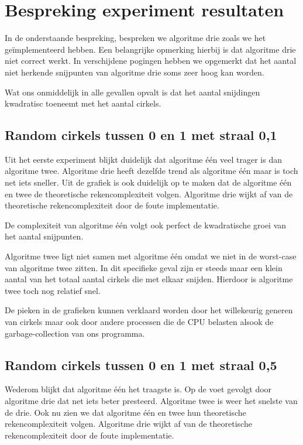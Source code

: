 \documentclass[11pt,a4paper]{article}
\begin{document}
\section{Bespreking experiment resultaten}

In de onderstaande bespreking, bespreken we algoritme drie zoals we het ge\"implementeerd hebben. Een belangrijke opmerking hierbij is dat algoritme drie niet correct werkt. In verschijdene pogingen hebben we opgemerkt dat het aantal niet herkende snijpunten van algoritme drie soms zeer hoog kan worden.

Wat ons onmiddelijk in alle gevallen opvalt is dat het aantal snijdingen kwadratisc toeneemt met het aantal cirkels.

\subsection{Random cirkels tussen 0 en 1 met straal 0,1}

Uit het eerste experiment blijkt duidelijk dat algoritme \'e\'en veel trager is dan algoritme twee. Algoritme drie heeft dezelfde trend als algoritme \'e\'en maar is toch net iets sneller. Uit de grafiek is ook duidelijk op te maken dat de algoritme \'e\'en en twee de theoretische rekencomplexiteit volgen. Algoritme drie wijkt af van de theoretische rekencomplexiteit door de foute implementatie.

De complexiteit van algoritme \'e\'en volgt ook perfect de kwadratische groei van het aantal snijpunten.

Algoritme twee ligt niet samen met algoritme \'e\'en omdat we niet in de worst-case van algoritme twee zitten. In dit specifieke geval zijn er steeds maar een klein aantal van het totaal aantal cirkels die met elkaar snijden. Hierdoor is algoritme twee toch nog relatief snel.

De pieken in de grafieken kunnen verklaard worden door het willekeurig generen van cirkels maar ook door andere processen die de CPU belasten alsook de garbage-collection van ons programma. 

\subsection{Random cirkels tussen 0 en 1 met straal 0,5}

Wederom blijkt dat algoritme \'e\'en het traagste is. Op de voet gevolgt door algoritme drie dat net iets beter presteerd. Algoritme twee is weer het snelste van de drie. Ook nu zien we dat algoritme \'e\'en en twee hun theoretische rekencomplexiteit volgen. Algoritme drie wijkt af van de theoretische rekencomplexiteit door de foute implementatie.
\end{document}
